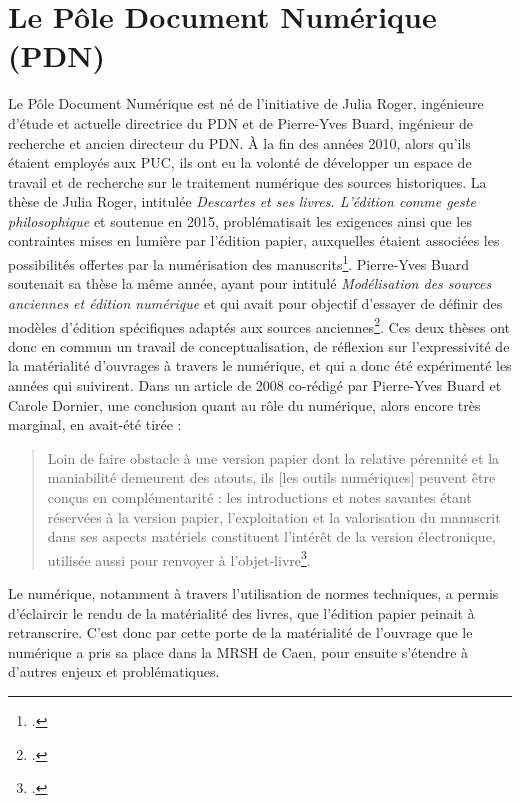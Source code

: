 \documentclass[a4paper,12pt,twoside]{book}
\begin{document}
    \section{Le Pôle Document Numérique (PDN)}
    
    Le Pôle Document Numérique est né de l'initiative de Julia Roger, ingénieure d'étude et actuelle directrice du \acrshort{PDN} et de Pierre-Yves Buard, ingénieur de recherche et ancien directeur du \acrshort{PDN}. À la fin des années 2010, alors qu'ils étaient employés aux \acrshort{PUC}, ils ont eu la volonté de développer un espace de travail et de recherche sur le traitement numérique des sources historiques. La thèse de Julia Roger, intitulée \og\textit{Descartes et ses livres. L'édition comme geste philosophique} \fg{} et soutenue en 2015, problématisait les exigences ainsi que les contraintes mises en lumière par l'édition papier, auxquelles étaient associées les possibilités offertes par la numérisation des manuscrits\footcite{roger_descartes_2015}. Pierre-Yves Buard soutenait sa thèse la même année, ayant pour intitulé \og \textit{Modélisation des sources anciennes et édition numérique} \fg{} et qui avait pour objectif d'essayer de définir des modèles d'édition spécifiques adaptés aux sources anciennes\footcite{buard_modelisation_2015}. Ces deux thèses ont donc en commun un travail de conceptualisation, de réflexion sur l'expressivité de la matérialité d'ouvrages à travers le numérique, et qui a donc été expérimenté les années qui suivirent. Dans un article de 2008 co-rédigé par Pierre-Yves Buard et Carole Dornier, une conclusion quant au rôle du numérique, alors encore très marginal, en avait-été tirée :  
    \begin{quote}
        Loin de faire obstacle à une version papier dont la relative pérennité et la maniabilité demeurent des atouts, ils [les outils numériques] peuvent être conçus en complémentarité : les introductions et notes savantes étant réservées à la version papier, l'exploitation et la valorisation du manuscrit dans ses aspects matériels constituent l'intérêt de la version électronique, utilisée aussi pour renvoyer à l'objet-livre\footcite{montesquieu}.
    \end{quote}
    Le numérique, notamment à travers l'utilisation de normes techniques, a permis d'éclaircir le rendu de la matérialité des livres, que l'édition papier peinait à retranscrire. C'est donc par cette porte de la matérialité de l'ouvrage que le numérique a pris sa place dans la \acrshort{MRSH} de Caen, pour ensuite s'étendre à d'autres enjeux et problématiques.
\end{document}
